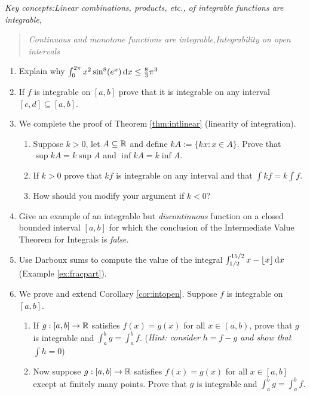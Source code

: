 \begin{exercises}
	\emph{Key concepts:\quad Linear combinations, products, etc., of integrable functions are integrable,}\vspace{-5pt}
 	\begin{quote}
 		\emph{Continuous and monotone functions are integrable,\qquad Integrability on open intervals}
 	\end{quote}


	\begin{enumerate}
	  \item Explain why $\int_{0}^{2\pi}x^2\sin^8(e^x)\,{\mathrm{d} x} \le\frac 83\pi^3$
	  
	  
		\item If $f$ is integrable on $[a,b]$ prove that it is integrable on any interval $[c,d]\subseteq[a,b]$.
		
		
		\item We complete the proof of Theorem \ref{thm:intlinear} (linearity of integration).
		\begin{enumerate}
	  	\item Suppose $k>0$, let $A\subseteq\mathbb{R}$ and define $kA:=\{kx:x\in A\}$. Prove that $\sup kA=k\sup A$ and $\inf kA=k\inf A$.
	  	\item If $k>0$ prove that $kf$ is integrable on any interval and that $\int kf=k\int f$.
	  	\item How should you modify your argument if $k<0$?
		\end{enumerate}
		
	  
	  \item Give an example of an integrable but \emph{discontinuous} function on a closed bounded interval $[a,b]$ for which the conclusion of the Intermediate Value Theorem for Integrals is \emph{false.}
	  
	  
		\item Use Darboux sums to compute the value of the integral $\int_{1/2}^{{15/2}} x-\lfloor x\rfloor \,{\mathrm{d} x}$ (Example \ref{ex:fracpart}).
		
		
		\item\label{exs:extensionlemma} We prove and extend Corollary \ref{cor:intopen}. Suppose $f$ is integrable on $[a,b]$. 
		\begin{enumerate}
		  \item If $g:[a,b]\to\mathbb{R}$ satisfies $f(x)=g(x)$ for all $x\in (a,b)$, prove that $g$ is integrable and $\int_a^bg=\int_a^bf$.\smallbreak
			(\emph{Hint: consider $h=f-g$ and show that $\int h=0$})
			\item Now suppose $g:[a,b]\to\mathbb{R}$ satisfies $f(x)=g(x)$ for all $x\in [a,b]$ except at finitely many points. Prove that $g$ is integrable and $\int_a^bg=\int_a^bf$.
		\end{enumerate}
	  

\end{enumerate}
\end{exercises}
